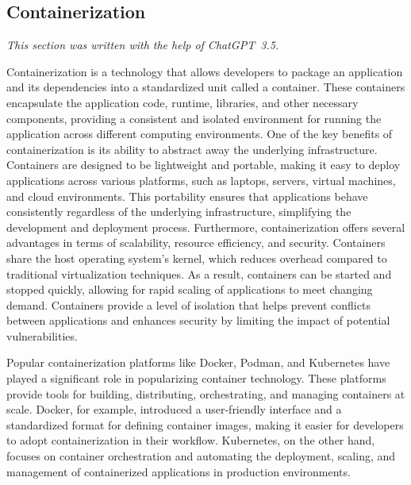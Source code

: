 \documentclass{easychair}
\begin{document}
\subsection{Containerization}
\label{Containerization}

{\em This section was written with the help of ChatGPT~3.5.}

Containerization is a technology that allows developers to package an application and its 
dependencies into a standardized unit called a container. 
These containers encapsulate the application code, runtime, libraries, and other necessary 
components, providing a consistent and isolated environment for running the application 
across different computing environments.
One of the key benefits of containerization is its ability to abstract away the underlying 
infrastructure. 
Containers are designed to be lightweight and portable, making it easy to deploy applications 
across various platforms, such as laptops, servers, virtual machines, and cloud environments. 
This portability ensures that applications behave consistently regardless of the underlying 
infrastructure, simplifying the development and deployment process.
Furthermore, containerization offers several advantages in terms of scalability, resource 
efficiency, and security. 
Containers share the host operating system's kernel, which reduces overhead compared to 
traditional virtualization techniques. 
As a result, containers can be started and stopped quickly, allowing for rapid scaling of 
applications to meet changing demand. 
Containers provide a level of isolation that helps prevent conflicts between applications and 
enhances security by limiting the impact of potential vulnerabilities.

Popular containerization platforms like Docker, Podman, and Kubernetes have played a significant 
role in popularizing container technology. 
These platforms provide tools for building, distributing, orchestrating, and managing containers 
at scale. 
Docker, for example, introduced a user-friendly interface and a standardized format for defining 
container images, making it easier for developers to adopt containerization in their workflow. 
Kubernetes, on the other hand, focuses on container orchestration and automating the deployment, 
scaling, and management of containerized applications in production environments.

\end{document}
